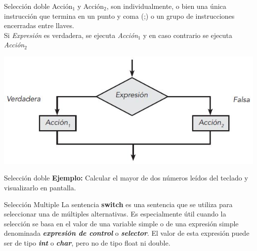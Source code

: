 \begin{frame}{Selección doble}
Acción$ _{1} $ y Acción$ _{2} $, son individualmente, o bien una única instrucción que termina en
un punto y coma (;) o un grupo de instrucciones encerradas entre llaves.\\
\vspace{2mm}
Si \textit{Expresión} es verdadera, se ejecuta \textit{Acción$ _{1} $} y en caso contrario se ejecuta \textit{Acción$ _{2} $}
\begin{center}
	\includegraphics[width=0.7\linewidth]{figs/flujoSeleccionDoble}
\end{center}
\end{frame}

\begin{frame}[fragile]{Selección doble}
\textbf{Ejemplo:} Calcular el mayor de dos números leídos del teclado y visualizarlo en pantalla.
%

\end{frame}


\begin{frame}[c]{Selección Multiple}
La sentencia \textbf{switch} es una sentencia que se utiliza para seleccionar una de múltiples alternativas. Es especialmente útil cuando la selección se basa en el valor de una variable simple o de una expresión simple denominada \textbf{\textit{expresión de control}} o \textbf{\textit{selector}}. El valor de esta expresión puede ser de tipo \textit{\textbf{int}} o \textbf{\textit{char}}, pero no de tipo float ni double.
\end{frame}

